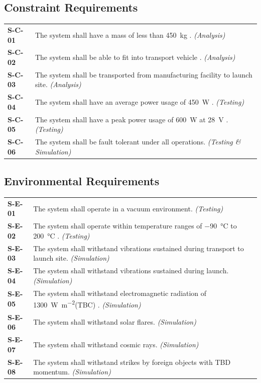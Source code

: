 \documentclass[12pt, letterpaper]{article}
\begin{document}
\subsection{Constraint Requirements}
\begin{longtable}{P{1.5cm}P{14.25cm}}
\textbf{S-C-01}	& The system shall have a mass of less than \SI{450}{\kg} \cite{RFP}. \textit{(Analysis)}								\\
\textbf{S-C-02}	& The system shall be able to fit into transport vehicle \cite{RFP}	. \textit{(Analysis)}							\\
\textbf{S-C-03}	& The system shall be transported from manufacturing facility to launch site. \textit{(Analysis)}							\\
\textbf{S-C-04}	& The system shall have an average power usage of \SI{450}{\watt} \cite{RFP}.	\textit{(Testing)}						\\
\textbf{S-C-05}	& The system shall have a peak power usage of \SI{600}{\watt} at \SI{28}{\volt} \cite{RFP}. \textit{(Testing)}			\\
\textbf{S-C-06}	& The system shall be fault tolerant under all operations. \textit{(Testing \& Simulation)}							\\
\end{longtable}

\subsection{Environmental Requirements}
\begin{longtable}{P{1.5cm}P{14.25cm}}
\textbf{S-E-01}	& The system shall operate in a vacuum environment. \textit{(Testing)}													\\
\textbf{S-E-02}	& The system shall operate within temperature ranges of \SI{-90}{\degreeCelsius} to \SI{200}{\degreeCelsius} \cite{NASAsysreq_Kumar}. \textit{(Testing)}													\\
\textbf{S-E-03}	& The system shall withstand vibrations sustained during transport to launch site. \textit{(Simulation)}				\\
\textbf{S-E-04}	& The system shall withstand vibrations sustained during launch. \textit{(Simulation)}									\\
\textbf{S-E-05}	& The system shall withstand electromagnetic radiation of \SI{1300}{\watt\per\square\m}(TBC)  \cite{FAA_radiation}. \textit{(Simulation)}												\\
\textbf{S-E-06}	& The system shall withstand solar flares. \textit{(Simulation)}												\\
\textbf{S-E-07}	& The system shall withstand cosmic rays. \textit{(Simulation)}												\\
\textbf{S-E-08}	& The system shall withstand strikes by foreign objects with TBD momentum. \textit{(Simulation)}								\\
\end{longtable}
\end{document}
